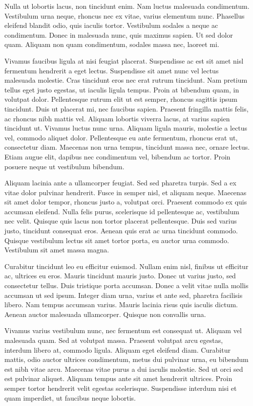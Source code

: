 \documentclass[
]{book}
\begin{document}
Nulla ut lobortis lacus, non tincidunt enim. Nam luctus malesuada condimentum. Vestibulum urna neque, rhoncus nec ex vitae, varius elementum nunc. Phasellus eleifend blandit odio, quis iaculis tortor. Vestibulum sodales a neque ac condimentum. Donec in malesuada nunc, quis maximus sapien. Ut sed dolor quam. Aliquam non quam condimentum, sodales massa nec, laoreet mi.

Vivamus faucibus ligula at nisi feugiat placerat. Suspendisse ac est sit amet nisl fermentum hendrerit a eget lectus. Suspendisse sit amet nunc vel lectus malesuada molestie. Cras tincidunt eros nec erat rutrum tincidunt. Nam pretium tellus eget justo egestas, ut iaculis ligula tempus. Proin at bibendum quam, in volutpat dolor. Pellentesque rutrum elit ut est semper, rhoncus sagittis ipsum tincidunt. Duis ut placerat mi, nec faucibus sapien. Praesent fringilla mattis felis, ac rhoncus nibh mattis vel. Aliquam lobortis viverra lacus, at varius sapien tincidunt ut. Vivamus luctus nunc urna. Aliquam ligula mauris, molestie a lectus vel, commodo aliquet dolor. Pellentesque eu ante fermentum, rhoncus erat ut, consectetur diam. Maecenas non urna tempus, tincidunt massa nec, ornare lectus. Etiam augue elit, dapibus nec condimentum vel, bibendum ac tortor. Proin posuere neque ut vestibulum bibendum.

Aliquam lacinia ante a ullamcorper feugiat. Sed sed pharetra turpis. Sed a ex vitae dolor pulvinar hendrerit. Fusce in semper nisl, et aliquam neque. Maecenas sit amet dolor tempor, rhoncus justo a, volutpat orci. Praesent commodo ex quis accumsan eleifend. Nulla felis purus, scelerisque id pellentesque ac, vestibulum nec velit. Quisque quis lacus non tortor placerat pellentesque. Duis sed varius justo, tincidunt consequat eros. Aenean quis erat ac urna tincidunt commodo. Quisque vestibulum lectus sit amet tortor porta, eu auctor urna commodo. Vestibulum sit amet massa magna.

Curabitur tincidunt leo eu efficitur euismod. Nullam enim nisl, finibus ut efficitur ac, ultrices eu eros. Mauris tincidunt mauris justo. Donec ut varius justo, sed consectetur tellus. Duis tristique porta accumsan. Donec a velit vitae nulla mollis accumsan ut sed ipsum. Integer diam urna, varius et ante sed, pharetra facilisis libero. Nam tempus accumsan varius. Mauris lacinia risus quis iaculis dictum. Aenean auctor malesuada ullamcorper. Quisque non convallis urna.

Vivamus varius vestibulum nunc, nec fermentum est consequat ut. Aliquam vel malesuada quam. Sed at volutpat massa. Praesent volutpat arcu egestas, interdum libero at, commodo ligula. Aliquam eget eleifend diam. Curabitur mattis, odio auctor ultrices condimentum, metus dui pulvinar urna, eu bibendum est nibh vitae arcu. Maecenas vitae purus a dui iaculis molestie. Sed ut orci sed est pulvinar aliquet. Aliquam tempus ante sit amet hendrerit ultrices. Proin semper tortor hendrerit velit egestas scelerisque. Suspendisse interdum nisi et quam imperdiet, ut faucibus neque lobortis.
\end{document}
